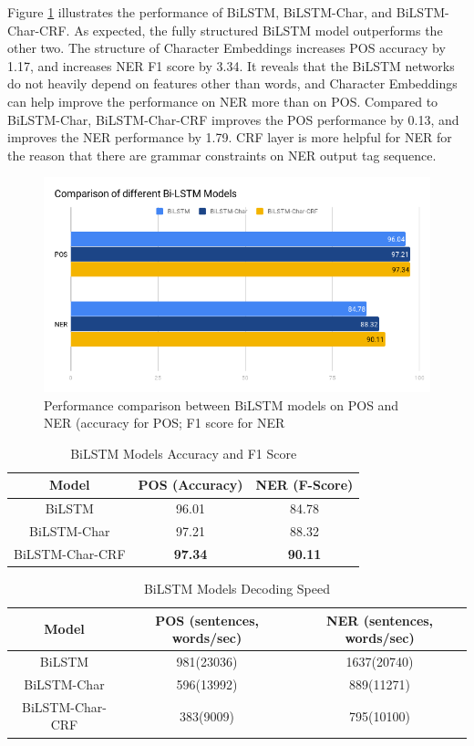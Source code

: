 Figure \ref{fig:lstmbar} illustrates the performance of BiLSTM, BiLSTM-Char, and BiLSTM-Char-CRF. As expected, the fully structured BiLSTM model outperforms the other two. The structure of Character Embeddings increases POS accuracy by 1.17, and increases NER F1 score by 3.34. It reveals that the BiLSTM networks do not heavily depend on features other than words, and Character Embeddings can help improve the performance on NER more than on POS. Compared to BiLSTM-Char, BiLSTM-Char-CRF improves the POS performance by 0.13, and improves the NER performance by 1.79. CRF layer is more helpful for NER for the reason that there are grammar constraints on NER output tag sequence.

\begin{figure}
  \centering
  \includegraphics[scale=0.6]{lstmbar.png}
 \caption{Performance comparison between BiLSTM models on POS and NER (accuracy for POS; F1 score for NER}
  \label{fig:lstmbar}
\end{figure}


\begin{table}[]
\centering
\caption{BiLSTM Models Accuracy and F1 Score}
\label{table:lstm-table1}
\begin{tabular}{|c|c|c|}
\hline
Model         & POS (Accuracy)  & NER (F-Score)       \\ \hline
BiLSTM  & 96.01     & 84.78                             \\ \hline
BiLSTM-Char & 97.21 & 88.32             \\ \hline
BiLSTM-Char-CRF & \textbf{97.34}  & \textbf{90.11}             \\ \hline
\end{tabular}
\end{table}

\begin{table}[]
\centering
\caption{BiLSTM Models Decoding Speed}
\label{table:lstm-table2}
\begin{tabular}{|c|c|c|}
\hline
Model       & POS  (sentences, words/sec)  & NER  (sentences, words/sec)      \\ \hline
BiLSTM             & 981(23036)     & 1637(20740)       \\ \hline
BiLSTM-Char        & 596(13992)  & 889(11271)             \\ \hline
BiLSTM-Char-CRF    & 383(9009)  & 795(10100)         \\ \hline
\end{tabular}
\end{table}


